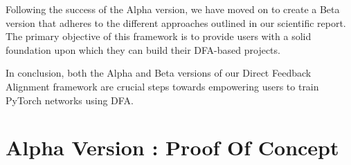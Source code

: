\documentclass[english]{article}
\begin{document}
Following the success of the Alpha version, we have moved on to create a Beta version that adheres to the different approaches outlined in our scientific report. The primary objective of this framework is to provide users with a solid foundation upon which they can build their DFA-based projects.

In conclusion, both the Alpha and Beta versions of our Direct Feedback Alignment framework are crucial steps towards empowering users to train PyTorch networks using DFA.



\section{Alpha Version : Proof Of Concept}




\end{document}
